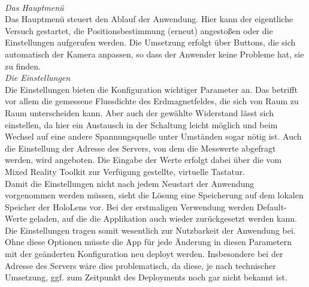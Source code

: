 \vspace{8px}
\begin{center}
	\\
\end{center}
\vspace{6px}

\textit{Das Hauptmenü}\\
Das Hauptmenü steuert den Ablauf der Anwendung. Hier kann der eigentliche Versuch gestartet, die Positionsbestimmung (erneut) angestoßen oder die Einstellungen aufgerufen werden. Die Umsetzung erfolgt über Buttons, die sich automatisch der Kamera anpassen, so dass der Anwender keine Probleme hat, sie zu finden.\\

\textit{Die Einstellungen}\\
Die Einstellungen bieten die Konfiguration wichtiger Parameter an. Das betrifft vor allem die gemessene Flussdichte des Erdmagnetfeldes, die sich von Raum zu Raum unterscheiden kann. Aber auch der gewählte Widerstand lässt sich einstellen, da hier ein Austausch in der Schaltung leicht möglich und beim Wechsel auf eine andere Spannungsquelle unter Umständen sogar nötig ist. Auch die Einstellung der Adresse des Servers, von dem die Messwerte abgefragt werden, wird angeboten. Die Eingabe der Werte erfolgt dabei über die vom Mixed Reality Toolkit zur Verfügung gestellte, virtuelle Tastatur.\\

Damit die Einstellungen nicht nach jedem Neustart der Anwendung vorgenommen werden müssen, sieht die Lösung eine Speicherung auf dem lokalen Speicher der HoloLens vor. Bei der erstmaligen Verwendung werden Default-Werte geladen, auf die die Applikation auch wieder zurückgesetzt werden kann. Die Einstellungen tragen somit wesentlich zur Nutzbarkeit der Anwendung bei. Ohne diese Optionen müsste die App für jede Änderung in diesen Parametern mit der geänderten Konfiguration neu deployt werden. Insbesondere bei der Adresse des Servers wäre dies problematisch, da diese, je nach technischer Umsetzung, ggf. zum Zeitpunkt des Deployments noch gar nicht bekannt ist.\\


